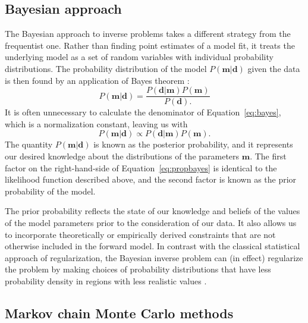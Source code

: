\documentclass[11pt,letterpaper]{article}
\begin{document}
\subsection*{Bayesian approach}

The Bayesian approach to inverse problems takes a different strategy from the frequentist one. Rather than finding point estimates of a model fit, it treats the underlying model as a set of random variables with individual probability distributions. The probability distribution of the model $P(\mathbf{m} \vert \mathbf{d})$ given the data  is then found by an application of Bayes theorem \citep[cf.][]{Sivia2006a}:
\begin{equation}
P\left(\mathbf{m} \vert \mathbf{d} \right) = \frac{ P \left(\mathbf{d}\vert \mathbf{m} \right) P \left( \mathbf{m} \right) }{P \left( \mathbf{d}\right).}
\label{eq:bayes}
\end{equation}
It is often unnecessary to calculate the denominator of Equation~\eqref{eq:bayes}, which is a normalization constant, leaving us with
\begin{equation}
P\left(\mathbf{m} \vert \mathbf{d} \right) \propto P \left( \mathbf{d} \vert \mathbf{m} \right) P \left( \mathbf{m} \right).
\label{eq:propbayes}
\end{equation}
The quantity $P(\mathbf{m} \vert \mathbf{d})$ is known as the posterior probability, and it represents our desired knowledge about the distributions of the parameters $\mathbf{m}$. The first factor on the right-hand-side of Equation~\eqref{eq:propbayes} is identical to the likelihood function described above, and the second factor
is known as the prior probability of the model.

The prior probability reflects the state of our knowledge and beliefs of the values of the model parameters prior to the consideration of our data. It also allows us to incorporate theoretically or empirically derived constraints that are not otherwise included in the forward model. In contrast with the classical statistical approach of regularization, the Bayesian inverse problem can (in effect) regularize the problem by making
choices of probability distributions that have less probability density in regions with less realistic values \citep[e.g.][]{Minson2013a, Sambridge2013a}.

\subsection*{Markov chain Monte Carlo methods}
\end{document}
